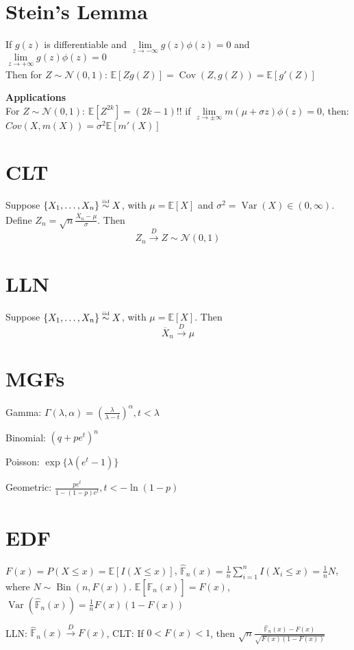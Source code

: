 \documentclass[twocolumn]{amsart}
\newcommand{\E}{\mathbb{E}}
\newcommand{\Cov}{\operatorname{Cov}}
\newcommand{\Var}{\operatorname{Var}}
\newcommand{\Bin}{\operatorname{Bin}}
\newcommand\iid{\mathrel{\overset{\makebox[0pt]{\mbox{\normalfont\tiny iid}}}{\sim}}}
\begin{document}
\section*{Stein's Lemma}
If \(g(z)\) is differentiable and \(\lim\limits_{z\to-\infty} g(z)\phi(z) = 0\) and \(\lim\limits_{z\to+\infty} g(z)\phi(z) = 0\) \\
Then for \(Z\sim\mathcal{N}(0, 1)\): $\E[Z g(Z)] = \Cov(Z, g(Z)) = \E[g'(Z)]$

\textbf{Applications}\\
For \(Z\sim\mathcal{N}(0,1)\): $\E[Z^{2k}] = (2k - 1)!!$
if \(\lim\limits_{z\to\pm\infty} m(\mu + \sigma z)\phi(z)=0\), then: $Cov(X,m(X)) = \sigma^{2}\E[m'(X)]$

\section*{CLT}
Suppose \(\{X_{1},\ldots,X_{n}\} \iid X\), with \(\mu = \E[X]\) and \(\sigma^{2} = \Var(X) \in (0, \infty)\). Define \(Z_{n}=\sqrt{n}\frac{\overline{X}_{n}-\mu}{\sigma}\). Then
\begin{equation*}
  Z_{n} \overset{D}{\longrightarrow} Z\sim\mathcal{N}(0,1)
\end{equation*}

\section*{LLN}
Suppose \(\{X_{1},\ldots,X_{n}\} \iid X\), with \(\mu = \E[X]\). Then
\begin{equation*}
  \overline{X}_{n} \overset{D}{\longrightarrow} \mu
\end{equation*}

\section*{MGFs}
Gamma: $\Gamma(\lambda,\alpha) =
\left(\frac{\lambda}{\lambda-t}\right)^{\alpha}, t < \lambda$

Binomial: $(q+pe^{t})^{n}$

Poisson: $\exp\{\lambda(e^{t} - 1)\}$

Geometric: $\frac{pe^{t}}{1-(1-p)e^{t}}, t<-\ln(1-p)$

\section*{EDF}
$F(x)=P(X\leq x)=\E[I(X\leq x)]$, $\hat{\mathbb{F}}_{n}(x) =
\frac{1}{n}\sum_{i=1}^{n}I(X_{i}\leq x) = \frac{1}{n}N$, where
$N\sim\Bin(n,F(x))$. $\E[\hat{\mathbb{F}}_{n}(x)] = F(x)$,
$\Var(\hat{\mathbb{F}}_{n}(x)) = \frac{1}{n}F(x)(1-F(x))$

LLN: $\hat{\mathbb{F}}_{n}(x) \overset{D}{\to} F(x)$, CLT: If $0<F(x)<1$, then
$\sqrt{n}\frac{\hat{\mathbb{F}}_{n}(x) - F(x)}{\sqrt{F(x)(1-F(x))}}$
\end{document}
